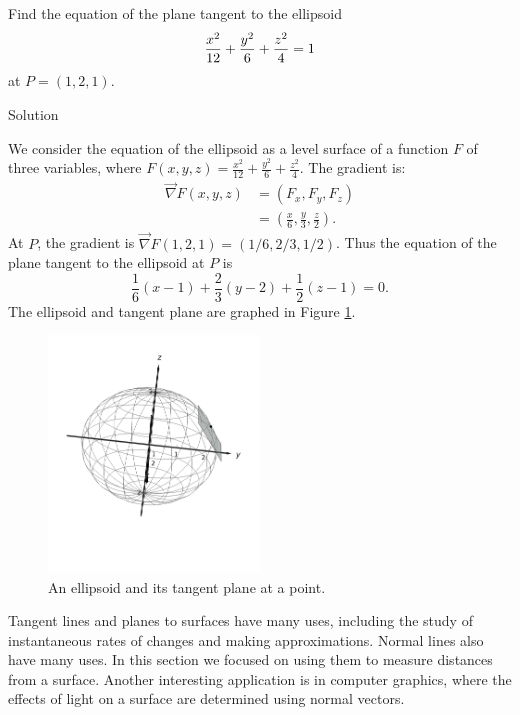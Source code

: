 \begin{example}\label{ex_tpl8}
Find the equation of the plane tangent to the ellipsoid $$\displaystyle \frac{x^2}{12} +\frac{y^2}{6}+\frac{z^2}{4}=1$$ at $P = (1,2,1)$.

Solution 

We consider the equation of the ellipsoid as a level surface of a function $F$ of three variables, where $F(x,y,z) = \frac{x^2}{12} +\frac{y^2}{6}+\frac{z^2}{4}$.  The gradient is:
\begin{align*}
\vec{\nabla} F(x,y,z) &= \left( F_x, F_y,F_z\right) \\
			&= \left( \frac x6, \frac y3, \frac z2\right).
\end{align*}
At  $P$, the gradient is $\vec{\nabla} F(1,2,1) = \left( 1/6, 2/3, 1/2\right)$. Thus the equation of the plane tangent to the ellipsoid at $P$ is
$$\frac 16(x-1) + \frac23(y-2) + \frac 12(z-1) = 0.$$ The ellipsoid and tangent plane are graphed in Figure \ref{fig_multi_var_21}.

\begin{figure}[H]
	\begin{center}
			\includegraphics[width=0.5\textwidth]{fig_multi_var_21}
	\caption{An ellipsoid and its tangent plane at a point.}
	\label{fig_multi_var_21}
	\end{center}
\end{figure}

\end{example}

Tangent lines and planes to surfaces have many uses, including the study of instantaneous rates of changes and making approximations. Normal lines also have many uses. In this section we focused on using them to measure distances from a surface. Another interesting application is in computer graphics, where the effects of light on a surface are determined using normal vectors.

